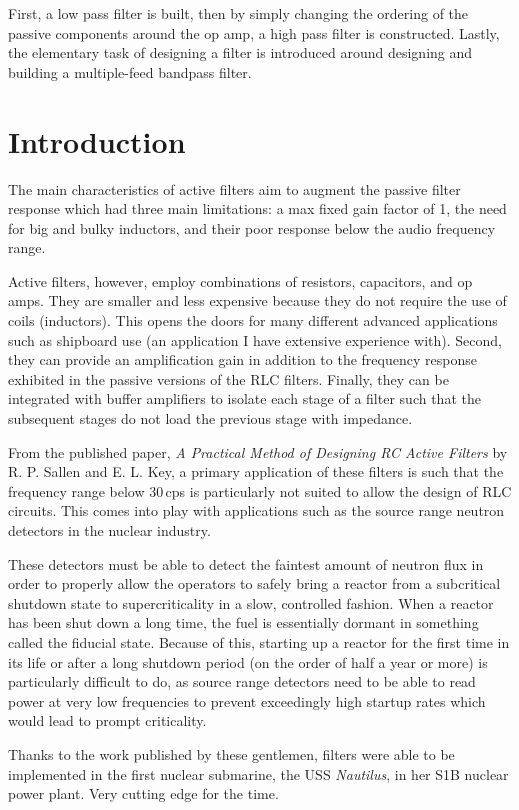 \documentclass[12pt]{article}
\begin{document}
First, a low pass filter is built, then by simply changing the ordering of the
passive components around the op amp, a high pass filter is constructed. Lastly,
the elementary task of designing a filter is introduced around designing and
building a multiple-feed bandpass filter.

\newpage
\section{Introduction}
The main characteristics of active filters aim to augment the passive filter
response which had three main limitations: a max fixed gain factor of 1, the
need for big and bulky inductors, and their poor response below the audio
frequency range. 

Active filters, however, employ combinations of resistors,
capacitors, and op amps. They are smaller and less expensive because they do not
require the use of coils (inductors). This opens the doors for many different
advanced applications such as shipboard use (an application I have extensive
experience with). Second, they can provide an amplification gain in addition to
the frequency response exhibited in the passive versions of the RLC filters.
Finally, they can be integrated with buffer amplifiers to isolate each stage of
a filter such that the subsequent stages do not load the previous stage with
impedance.

From the published paper, \emph{A Practical Method of Designing RC Active
Filters} by R. P. Sallen and E. L. Key, a primary application of these filters
is such that the frequency range below $30$\,cps is particularly not suited to
allow the design of RLC circuits. This comes into play with applications such as
the source range neutron detectors in the nuclear industry.

These detectors must be able to detect the faintest amount of neutron flux in
order to properly allow the operators to safely bring a reactor from a
subcritical shutdown state to supercriticality in a slow, controlled fashion.
When a reactor has been shut down a long time, the fuel is essentially dormant
in something called the fiducial state. Because of this, starting up a reactor
for the first time in its life or after a long shutdown period (on the order of
half a year or more) is particularly difficult to do, as source range detectors
need to be able to read power at very low frequencies to prevent exceedingly
high startup rates which would lead to prompt criticality.

Thanks to the work published by these gentlemen, filters were able to be
implemented in the first nuclear submarine, the USS \emph{Nautilus}, in her S1B
nuclear power plant. Very cutting edge for the time.
\end{document}
